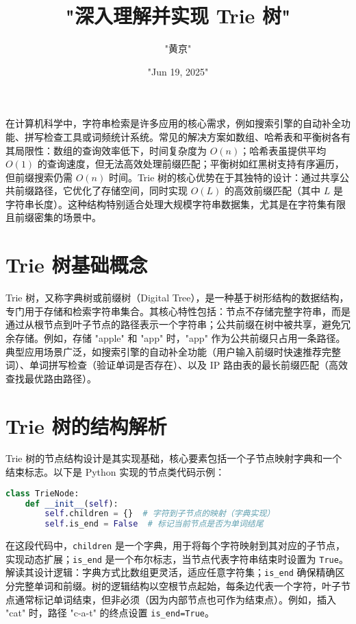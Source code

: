 \title{"深入理解并实现 Trie 树"}
\author{"黄京"}
\date{"Jun 19, 2025"}
\maketitle
在计算机科学中，字符串检索是许多应用的核心需求，例如搜索引擎的自动补全功能、拼写检查工具或词频统计系统。常见的解决方案如数组、哈希表和平衡树各有其局限性：数组的查询效率低下，时间复杂度为 $O(n)$；哈希表虽提供平均 $O(1)$ 的查询速度，但无法高效处理前缀匹配；平衡树如红黑树支持有序遍历，但前缀搜索仍需 $O(n)$ 时间。Trie 树的核心优势在于其独特的设计：通过共享公共前缀路径，它优化了存储空间，同时实现 $O(L)$ 的高效前缀匹配（其中 $L$ 是字符串长度）。这种结构特别适合处理大规模字符串数据集，尤其是在字符集有限且前缀密集的场景中。\par
\chapter{Trie 树基础概念}
Trie 树，又称字典树或前缀树（Digital Tree），是一种基于树形结构的数据结构，专门用于存储和检索字符串集合。其核心特性包括：节点不存储完整字符串，而是通过从根节点到叶子节点的路径表示一个字符串；公共前缀在树中被共享，避免冗余存储。例如，存储 "apple" 和 "app" 时，"app" 作为公共前缀只占用一条路径。典型应用场景广泛，如搜索引擎的自动补全功能（用户输入前缀时快速推荐完整词）、单词拼写检查（验证单词是否存在）、以及 IP 路由表的最长前缀匹配（高效查找最优路由路径）。\par
\chapter{Trie 树的结构解析}
Trie 树的节点结构设计是其实现基础，核心要素包括一个子节点映射字典和一个结束标志。以下是 Python 实现的节点类代码示例：\par
\begin{lstlisting}[language=python]
class TrieNode:
    def __init__(self):
        self.children = {}  # 字符到子节点的映射（字典实现）
        self.is_end = False  # 标记当前节点是否为单词结尾
\end{lstlisting}
在这段代码中，\texttt{children} 是一个字典，用于将每个字符映射到其对应的子节点，实现动态扩展；\texttt{is\_{}end} 是一个布尔标志，当节点代表字符串结束时设置为 \texttt{True}。解读其设计逻辑：字典方式比数组更灵活，适应任意字符集；\texttt{is\_{}end} 确保精确区分完整单词和前缀。树的逻辑结构以空根节点起始，每条边代表一个字符，叶子节点通常标记单词结束，但非必须（因为内部节点也可作为结束点）。例如，插入 "cat" 时，路径 "c-a-t" 的终点设置 \texttt{is\_{}end=True}。\par
